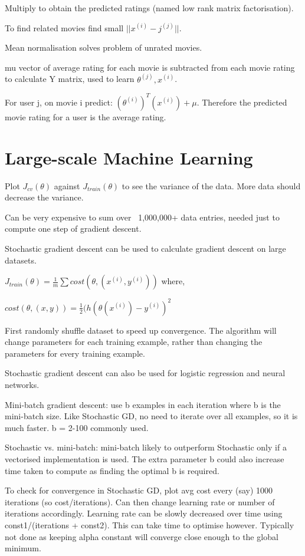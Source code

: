 \documentclass[12pt, a4paper]{article}
\begin{document}
{  Multiply to obtain the predicted ratings (named low rank matrix
  factorisation). 

  To find related movies find small $||x^{(i)}-j^{(j)}||$.

  Mean normalisation solves problem of unrated movies. 

  mu vector of average rating for each movie is subtracted from each movie
  rating to calculate Y matrix, used to learn $\theta^{(j)}, x^{(i)}$.
  
  For user j, on movie i predict: $(\theta^{(i)})^T(x^{(i)}) + \mu$. Therefore the predicted
  movie rating for a user is the average rating. 

  \newpage

\section{Large-scale Machine Learning}

  Plot $J_{cv}(\theta)$ against $J_{train}(\theta)$ to see the variance of the 
  data. More data should decrease the variance.

  Can be very expensive to sum over ~1,000,000+ data entries, needed just to 
  compute one step of gradient descent.

  Stochastic gradient descent can be used to calculate gradient descent on
  large datasets. 

  $J_{train}(\theta) = \frac{1}{m} \sum cost(\theta, (x^{(i)}, y^{(i)}))$ where,

  $cost(\theta, (x,y)) = \frac{1}{2} (h(\theta(x^{(i)}) - y^{(i)})^2$

  First randomly shuffle dataset to speed up convergence. The algorithm will 
  change parameters for each training example, rather than changing the
  parameters for every training example. 

  Stochastic gradient descent can also be used for logistic regression and
  neural networks.

  Mini-batch gradient descent: use b examples in each iteration where b is
  the mini-batch size. Like Stochastic GD, no need to iterate over all 
  examples, so it is much faster. b = 2-100 commonly used. 

  Stochastic vs. mini-batch: mini-batch likely to outperform Stochastic only
  if a vectorised implementation is used. The extra parameter b could also
  increase time taken to compute as finding the optimal b is required. 

  To check for convergence in Stochastic GD, plot avg cost every (say) 1000
  iterations (so cost/iterations). Can then change learning rate or number
  of iterations accordingly. Learning rate can be slowly decreased over 
  time using const1/(iterations + const2). This can take time to optimise
  however. Typically not done as keeping alpha constant will converge 
  close enough to the global minimum. 

}
\end{document}
